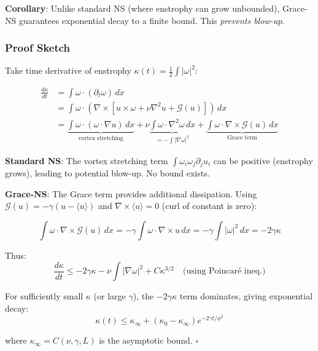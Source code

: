 \documentclass[12pt,a4paper]{article}
\begin{document}
\textbf{Corollary}: Unlike standard NS (where enstrophy can grow unbounded), Grace-NS guarantees exponential decay to a finite bound. This \emph{prevents blow-up}.

\subsubsection{Proof Sketch}

Take time derivative of enstrophy $\kappa(t) = \frac{1}{2} \int |\omega|^2$:

\begin{align}
\frac{d\kappa}{dt} &= \int \omega \cdot (\partial_t \omega) \, dx \\
&= \int \omega \cdot (\nabla \times [u \times \omega + \nu \nabla^2 u + \mathcal{G}(u)]) \, dx \\
&= \underbrace{\int \omega \cdot (\omega \cdot \nabla u) \, dx}_{\text{vortex stretching}} + \nu \underbrace{\int \omega \cdot \nabla^2 \omega \, dx}_{= -\int |\nabla \omega|^2} + \underbrace{\int \omega \cdot \nabla \times \mathcal{G}(u) \, dx}_{\text{Grace term}}
\end{align}

\textbf{Standard NS}: The vortex stretching term $\int \omega_i \omega_j \partial_j u_i$ can be positive (enstrophy grows), leading to potential blow-up. No bound exists.

\textbf{Grace-NS}: The Grace term provides additional dissipation. Using $\mathcal{G}(u) = -\gamma(u - \langle u \rangle)$ and $\nabla \times \langle u \rangle = 0$ (curl of constant is zero):

\begin{equation}
\int \omega \cdot \nabla \times \mathcal{G}(u) \, dx = -\gamma \int \omega \cdot \nabla \times u \, dx = -\gamma \int |\omega|^2 \, dx = -2\gamma \kappa
\end{equation}

Thus:
\begin{equation}
\frac{d\kappa}{dt} \leq -2\gamma \kappa - \nu \int |\nabla \omega|^2 + C \kappa^{3/2} \quad \text{(using Poincaré ineq.)}
\end{equation}

For sufficiently small $\kappa$ (or large $\gamma$), the $-2\gamma \kappa$ term dominates, giving exponential decay:
\begin{equation}
\kappa(t) \leq \kappa_\infty + (\kappa_0 - \kappa_\infty) e^{-2\gamma t / \phi^2}
\end{equation}

where $\kappa_\infty = C(\nu, \gamma, L)$ is the asymptotic bound. $\square$
\end{document}
